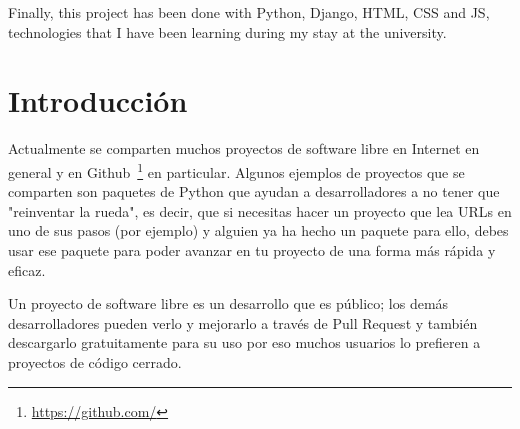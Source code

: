 \documentclass[a4paper, 12pt]{book}
\begin{document}
Finally, this project has been done with Python, Django, HTML, CSS and JS, technologies that I have been learning during my stay at the university.



\tableofcontents 
\cleardoublepage
\listoffigures %



\cleardoublepage
\chapter{Introducción}
\label{chap:introducción}
\label{sec:intro} %

Actualmente se comparten muchos proyectos de software libre en Internet en general y en Github~\cite{website:GitHub}\footnote{\url{https://github.com/}} en particular. Algunos ejemplos de proyectos que se comparten son paquetes de Python que
ayudan a desarrolladores a no tener que "reinventar la rueda", es decir, que si necesitas hacer un proyecto que lea URLs en uno de sus pasos (por ejemplo) y alguien ya ha hecho un paquete para
ello, debes usar ese paquete para poder avanzar en tu proyecto de una forma más rápida y eficaz.

Un proyecto de software libre es un desarrollo que es público; los demás desarrolladores pueden verlo y mejorarlo a través de Pull Request y también descargarlo gratuitamente para su uso por eso muchos usuarios lo prefieren a proyectos de código cerrado.
\end{document}

